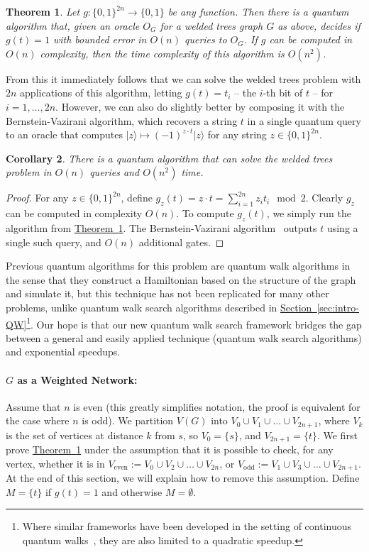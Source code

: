 \documentclass{article}
\newtheorem{theorem}{Theorem}\newtheorem{lemma}[theorem]{Lemma}\newtheorem{proposition}[theorem]{Proposition}\newtheorem{corollary}[theorem]{Corollary}\newtheorem{definition}[theorem]{Definition}\newtheorem{claim}[theorem]{Claim}\newtheorem{remark}[theorem]{Remark}\newenvironment{cfigure}[1][htbp]{\begin{figure}[#1]\centering}{\end{figure}}
\renewcommand{\sec}[1]{\hyperref[sec:#1]{Section~\ref*{sec:#1}}}
\newcommand{\thm}[1]{\hyperref[thm:#1]{Theorem~\ref*{thm:#1}}}
\def\ket#1{{\lvert}#1\rangle}
\renewcommand{\>}{\rangle}
\newcommand{\<}{\langle}
\renewcommand{\(}{\left(}
\renewcommand{\)}{\right)}
\begin{document}
\begin{theorem}\label{thm:welded}
Let $g:\{0,1\}^{2n}\rightarrow\{0,1\}$ be any function. Then there is a quantum algorithm that, given an oracle $O_G$ for a welded trees graph $G$ as above, decides if $g(t)=1$ with bounded error in $O(n)$ queries to $O_G$. If $g$ can be computed in $O(n)$ complexity, then the time complexity of this algorithm is ${O}(n^2)$. 
\end{theorem}


From this it immediately follows that we can solve the welded trees problem with $2n$ applications of this algorithm, letting $g(t)=t_i$ -- the $i$-th bit of $t$ -- for $i=1,\dots,2n$. However, we can also do slightly better by composing it with the Bernstein-Vazirani algorithm, which recovers a string $t$ in a single quantum query to an oracle that computes $\ket{z}\mapsto (-1)^{z\cdot t}\ket{z}$ for any string $z\in\{0,1\}^{2n}$.
\begin{corollary}
There is a quantum algorithm that can solve the welded trees problem in $O(n)$ queries and ${O}(n^2)$ time. 
\end{corollary}
\begin{proof}
For any $z\in\{0,1\}^{2n}$, define $g_z(t)=z\cdot t = \sum_{i=1}^{2n}z_it_i\mod 2$. Clearly $g_z$ can be computed in complexity $O(n)$. To compute $g_z(t)$, we simply run the algorithm from \thm{welded}. The Bernstein-Vazirani algorithm~\cite{bernstein1997BValg} outputs $t$ using a single such query, and $O(n)$ additional gates. 
\end{proof}

Previous quantum algorithms for this problem are quantum walk algorithms in the sense that they construct a Hamiltonian based on the structure of the graph and simulate it, but this technique has not been replicated for many other problems, unlike quantum walk search algorithms described in \sec{intro-QW}\footnote{Where similar frameworks have been developed in the setting of continuous quantum walks~\cite{apers2022quadratic}, they are also limited to a quadratic speedup.}. Our hope is that our new quantum walk search framework bridges the gap between a general and easily applied technique (quantum walk search algorithms) and exponential speedups. 



\paragraph{$G$ as a Weighted Network:} Assume that $n$ is even (this greatly simplifies notation, the proof is equivalent for the case where $n$ is odd). We partition $V(G)$ into $V_0\cup V_1\cup\dots\cup V_{2n+1}$, where $V_k$ is the set of vertices at distance $k$ from $s$, so $V_0=\{s\}$, and $V_{2n+1}=\{t\}$. We first prove \thm{welded} under the assumption that it is possible to check, for any vertex, whether it is in $V_{\mathrm{even}}:=V_0\cup V_2\cup\dots \cup V_{2n}$, or $V_{\mathrm{odd}}:=V_1\cup V_3\cup \dots\cup V_{2n+1}$. At the end of this section, we will explain how to remove this assumption. Define $M=\{t\}$ if $g(t)=1$ and otherwise $M=\emptyset$.
\end{document}
